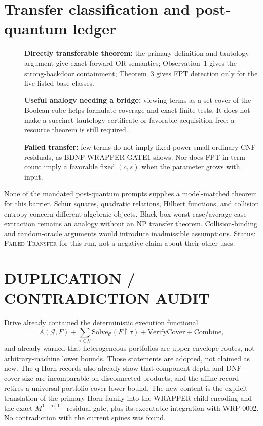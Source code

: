 \documentclass[11pt]{article}
\begin{document}
\section*{Transfer classification and post-quantum ledger}
\begin{description}
\item[] \textbf{Directly transferable theorem:} the primary definition and
tautology argument give exact forward OR semantics; Observation~1 gives the
strong-backdoor containment; Theorem~3 gives FPT detection only for the five
listed base classes.
\item[] \textbf{Useful analogy needing a bridge:} viewing terms as a set
cover of the Boolean cube helps formulate coverage and exact finite tests.
It does not make a succinct tautology certificate or favorable acquisition
free; a resource theorem is still required.
\item[] \textbf{Failed transfer:} few terms do not imply fixed-power small
ordinary-CNF residuals, as BDNF-WRAPPER-GATE1 shows.  Nor does FPT in term
count imply a favorable fixed $(c,s)$ when the parameter grows with input.
\end{description}

None of the mandated post-quantum prompts supplies a model-matched theorem
for this barrier.  Schur squares, quadratic relations, Hilbert functions,
and collision entropy concern different algebraic objects.  Black-box
worst-case/average-case extraction remains an analogy without an NP transfer
theorem.  Collision-binding and random-oracle arguments would introduce
inadmissible assumptions.  Status: \textsc{Failed Transfer} for this run,
not a negative claim about their other uses.

\section*{DUPLICATION / CONTRADICTION AUDIT}
Drive already contained the deterministic execution functional
\[
 A(\mathcal G,F)+\sum_{\tau\in\mathcal G}
 \mathrm{Solve}_{\mathcal C}(F\upharpoonright\tau)
 +\mathrm{VerifyCover}+\mathrm{Combine},
\]
and already warned that heterogeneous portfolios are upper-envelope routes,
not arbitrary-machine lower bounds.  Those statements are adopted, not
claimed as new.  The q-Horn records also already show that component depth
and DNF-cover size are incomparable on disconnected products, and the affine
record retires a universal portfolio-cover lower bound.  The new content is
the explicit translation of the primary Horn family into the WRAPPER child
encoding and the exact $M^{1-o(1)}$ residual gate, plus its executable
integration with WRP-0002.  No contradiction with the current spines was
found.
\end{document}

